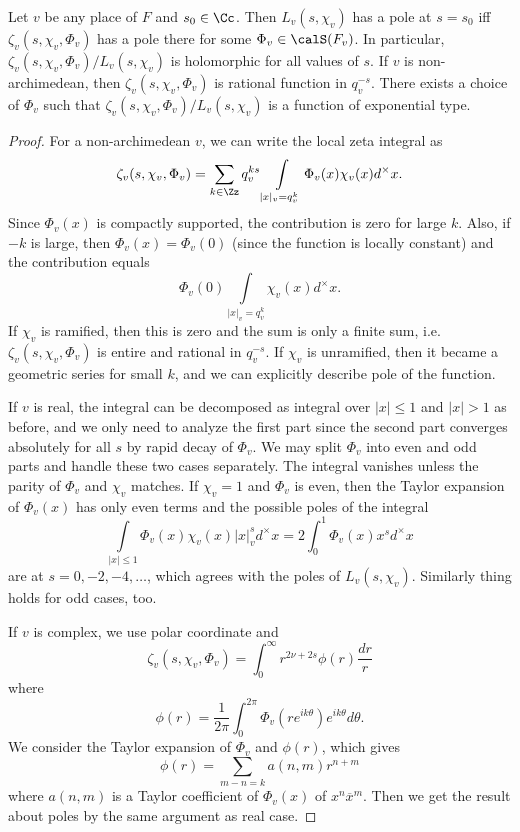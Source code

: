 \begin{proposition}
Let $v$ be any place of $F$ and $s_{0}\in \Cc$. Then $L_{v}(s, \chi_{v})$ has a pole at $s = s_{0}$ iff $\zeta_{v}(s, \chi_{v}, \Phi_{v})$ has a pole there for some $\Phi_{v}\in \calS(F_{v})$. 
In particular, $\zeta_{v}(s, \chi_{v}, \Phi_{v}) / L_{v}(s, \chi_{v})$ is holomorphic for all values of $s$. 
If $v$ is non-archimedean, then $\zeta_{v}(s, \chi_{v},\Phi_{v})$ is rational function in $q_{v}^{-s}$. 
There exists a choice of $\Phi_{v}$ such that $\zeta_{v}(s, \chi_{v} ,\Phi_{v})/L_{v}(s, \chi_{v})$ is a function of exponential type. 
\end{proposition}
\begin{proof}
For a non-archimedean $v$, we can write the local zeta integral as
$$
\zeta_{v}(s, \chi_{v}, \Phi_{v}) = \sum_{k\in \Zz} q_{v}^{ks} \int\limits_{|x|_{v} = q_{v}^{k}} \Phi_{v}(x)\chi_{v}(x)d^{\times}x.
$$
Since $\Phi_{v}(x)$ is compactly supported, the contribution is zero for large $k$. Also, if $-k$ is large, 
then $\Phi_{v}(x) = \Phi_{v}(0)$ (since the function is locally constant) and the contribution equals
$$
\Phi_{v}(0)\int\limits_{|x|_{v} = q_{v}^{k}} \chi_{v}(x)d^{\times}x.
$$
If $\chi_{v}$ is ramified, then this is zero and the sum is only a finite sum, i.e. $\zeta_{v}(s, \chi_{v}, \Phi_{v})$ is entire and rational in $q_{v}^{-s}$. 
If $\chi_{v}$ is unramified, then it became a geometric series for small $k$, and we can explicitly describe pole of the function. 

If $v$ is real, the integral can be decomposed as integral over $|x|\leq 1$ and $|x|>1$ as before, and we only need to analyze the first part since the second part converges absolutely for all $s$ by rapid decay of $\Phi_{v}$. 
We may split $\Phi_{v}$ into even and odd parts and handle these two cases separately. 
The integral vanishes unless the parity of $\Phi_{v}$ and $\chi_{v}$ matches. 
If $\chi_{v} = 1$ and $\Phi_{v}$ is even, then the Taylor expansion of $\Phi_{v}(x)$ has only even terms and the possible poles of the integral 
$$
\int\limits_{|x|\leq 1} \Phi_{v}(x) \chi_{v}(x)|x|_{v}^{s} d^{\times}x = 2\int_{0}^{1} \Phi_{v}(x) x^{s} d^{\times} x
$$
are at $s = 0, -2, -4, \dots$, which agrees with the poles of $L_{v}(s, \chi_{v})$. Similarly thing holds for odd cases, too. 

If $v$ is complex,  we use polar coordinate and 
$$
\zeta_{v}(s,\chi_{v}, \Phi_{v}) = \int_{0}^{\infty} r^{2\nu + 2s} \phi(r) \frac{dr}{r}
$$
where $$\phi(r) = \frac{1}{2\pi} \int_{0}^{2\pi} \Phi_{v}(re^{ik\theta}) e^{ik\theta}d\theta.$$
We consider the Taylor expansion of $\Phi_{v}$ and $\phi(r)$, which gives
$$
\phi(r) = \sum_{m-n = k} a(n, m) r^{n+m}
$$
where $a(n, m)$ is a Taylor coefficient of $\Phi_{v}(x)$ of $x^{n}\overline{x}^{m}$. 
Then we get the result about poles by the same argument as real case. 


\end{proof}
